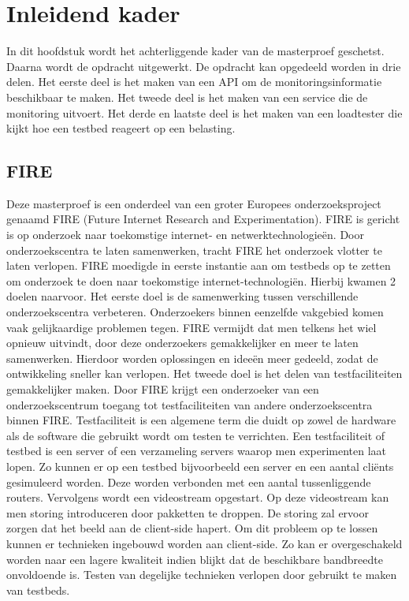 \chapter{Inleidend kader}
{\samenvatting
In dit hoofdstuk wordt het achterliggende kader van de masterproef geschetst. Daarna wordt de opdracht uitgewerkt. De opdracht kan opgedeeld worden in drie delen. Het eerste deel is het maken van een API om de monitoringsinformatie beschikbaar te maken. Het tweede deel is het maken van een service die de monitoring uitvoert. Het derde en laatste deel is het maken van een loadtester die kijkt hoe een testbed reageert op een belasting.}

\section{FIRE}
\npar
Deze masterproef is een onderdeel van een groter Europees onderzoeksproject genaamd FIRE (Future Internet Research and Experimentation). FIRE is gericht is op onderzoek naar toekomstige internet- en netwerktechnologie\"en. Door onderzoekscentra te laten samenwerken\citep{Fire-what-is}, tracht FIRE het onderzoek vlotter te laten verlopen. FIRE moedigde in eerste instantie aan om testbeds op te zetten om onderzoek te doen naar toekomstige internet-technologi\"en. Hierbij kwamen 2 doelen naarvoor.
\npar
Het eerste doel is de samenwerking tussen verschillende onderzoekscentra verbeteren. Onderzoekers binnen eenzelfde vakgebied komen vaak gelijkaardige problemen tegen. FIRE vermijdt dat men telkens het wiel opnieuw uitvindt, door deze onderzoekers gemakkelijker en meer te laten samenwerken. Hierdoor worden oplossingen en idee\"en meer gedeeld, zodat de ontwikkeling sneller kan verlopen.
\clearpage
\npar
Het tweede doel is het delen van testfaciliteiten gemakkelijker  maken. Door FIRE krijgt een onderzoeker van een onderzoekscentrum toegang tot testfaciliteiten van andere onderzoekscentra binnen FIRE. Testfaciliteit is een algemene term die duidt op zowel de hardware als de software die gebruikt wordt om testen te verrichten. Een testfaciliteit of testbed is een server of een verzameling servers waarop men experimenten laat lopen. 
\npar
Zo kunnen er op een testbed bijvoorbeeld een server en een aantal cli\"ents gesimuleerd worden. Deze worden verbonden met een aantal tussenliggende routers. Vervolgens wordt een videostream opgestart. Op deze videostream kan men storing introduceren door pakketten te droppen. De storing zal ervoor zorgen dat het beeld aan de client-side hapert. Om dit probleem op te lossen kunnen er technieken ingebouwd worden aan client-side. Zo kan er overgeschakeld worden naar een lagere kwaliteit indien blijkt dat de beschikbare bandbreedte onvoldoende is. Testen van degelijke technieken verlopen door gebruikt te maken van testbeds.


